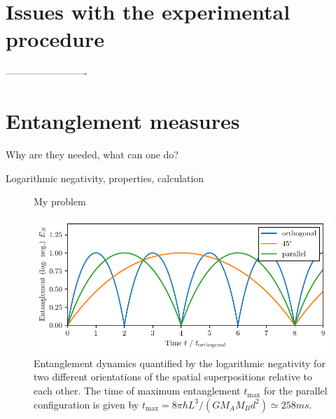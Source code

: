 \section{Issues with the experimental procedure}


-------------------------


\section{Entanglement measures}
Why are they needed, what can one do?

Logarithmic negativity, properties, calculation





\begin{figure}[!htbp]
  \centering
  \def\svgwidth{0.9\textwidth}
  
  \caption{My problem}
\end{figure}


\begin{figure}[!htbp]
  \centering
  \includegraphics[width=\textwidth]{./../figures/EN-orientation-time.pdf}
  \caption{Entanglement dynamics quantified by the logarithmic negativity for two different orientations of the spatial superpositions relative to each other. The time of maximum entanglement $t_\mathrm{max}$ for the parallel configuration is given by $t_\mathrm{max} = 8\pi\hbar L^3 / (G M_A M_B d^2) \simeq 258\si{ms}$.}
\end{figure}